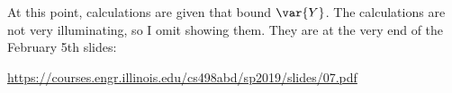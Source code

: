 \documentclass[../main.tex]{subfiles}
\begin{document}
\begin{remark}
    At this point, calculations are given that bound $\var{Y}$. The calculations are not very illuminating, so I omit showing them. They are at the very end of the February 5th slides:

    \url{https://courses.engr.illinois.edu/cs498abd/sp2019/slides/07.pdf}

\end{remark}
\end{document}
